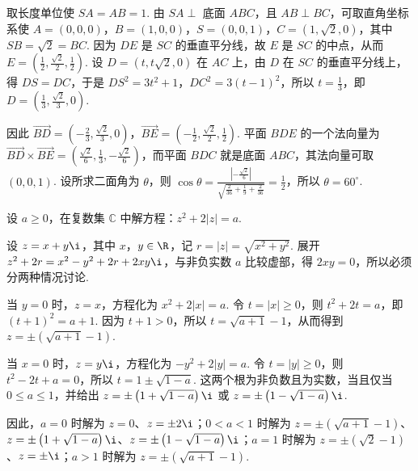 \documentclass[UTF8,a4paper,oneside,11pt]{ctexbook}
\begin{document}
\begin{solution}
取长度单位使 \(SA=AB=1\). 由 \(SA\perp\) 底面 \(ABC\)，且 \(AB\perp BC\)，可取直角坐标系使 \(A=(0,0,0)\)，\(B=(1,0,0)\)，\(S=(0,0,1)\)，\(C=(1,\sqrt{2},0)\)，其中 \(SB=\sqrt{2}=BC\). 因为 \(DE\) 是 \(SC\) 的垂直平分线，故 \(E\) 是 \(SC\) 的中点，从而 \(E=\left(\frac{1}{2},\frac{\sqrt{2}}{2},\frac{1}{2}\right)\). 设 \(D=(t,t\sqrt{2},0)\) 在 \(AC\) 上，由 \(D\) 在 \(SC\) 的垂直平分线上，得 \(DS=DC\)，于是 \(DS^2=3t^2+1\)，\(DC^2=3(t-1)^2\)，所以 \(t=\frac{1}{3}\)，即 \(D=\left(\frac{1}{3},\frac{\sqrt{2}}{3},0\right)\).

因此 \(\overrightarrow{BD}=\left(-\frac{2}{3},\frac{\sqrt{2}}{3},0\right)\)，\(\overrightarrow{BE}=\left(-\frac{1}{2},\frac{\sqrt{2}}{2},\frac{1}{2}\right)\). 平面 \(BDE\) 的一个法向量为 \(\overrightarrow{BD}\times\overrightarrow{BE}=\left(\frac{\sqrt{2}}{6},\frac{1}{3},-\frac{\sqrt{2}}{6}\right)\)，而平面 \(BDC\) 就是底面 \(ABC\)，其法向量可取 \((0,0,1)\). 设所求二面角为 \(\theta\)，则 \(\cos\theta=\frac{\left| -\frac{\sqrt{2}}{6}\right|}{\sqrt{\frac{2}{36}+\frac{1}{9}+\frac{2}{36}}}=\frac{1}{2}\)，所以 \(\theta=60^\circ\).
\end{solution}

\begin{problem}
设 \(a\geqslant 0\)，在复数集 \(\mathbb C\) 中解方程：\(z^2+2|z|=a\).
\end{problem}

\begin{solution}
设 \(z=x+y\i\)，其中 \(x\)，\(y\in\R\)，记 \(r=|z|=\sqrt{x^2+y^2}\). 展开 \(z^2+2r=x^2-y^2+2r+2xy\i\)，与非负实数 \(a\) 比较虚部，得 \(2xy=0\)，所以必须分两种情况讨论.

当 \(y=0\) 时，\(z=x\)，方程化为 \(x^2+2|x|=a\). 令 \(t=|x|\geqslant0\)，则 \(t^2+2t=a\)，即 \((t+1)^2=a+1\). 因为 \(t+1>0\)，所以 \(t=\sqrt{a+1}-1\)，从而得到 \(z=\pm\left(\sqrt{a+1}-1\right)\).

当 \(x=0\) 时，\(z=y\i\)，方程化为 \(-y^2+2|y|=a\). 令 \(t=|y|\geqslant0\)，则 \(t^2-2t+a=0\)，所以 \(t=1\pm\sqrt{1-a}\). 这两个根为非负数且为实数，当且仅当 \(0\leqslant a\leqslant1\)，并给出 \(z=\pm\left(1+\sqrt{1-a}\right)\i\) 或 \(z=\pm\left(1-\sqrt{1-a}\right)\i\).

因此，\(a=0\) 时解为 \(z=0\)、\(z=\pm2\i\)；\(0<a<1\) 时解为 \(z=\pm\left(\sqrt{a+1}-1\right)\)、\(z=\pm\left(1+\sqrt{1-a}\right)\i\)、\(z=\pm\left(1-\sqrt{1-a}\right)\i\)；\(a=1\) 时解为 \(z=\pm\left(\sqrt{2}-1\right)\)、\(z=\pm\i\)；\(a>1\) 时解为 \(z=\pm\left(\sqrt{a+1}-1\right)\).
\end{solution}
\end{document}
